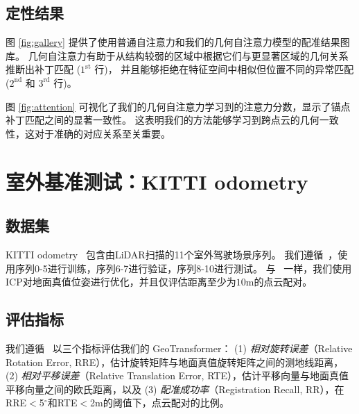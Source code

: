 \subsection{定性结果}
%
图 \ref{fig:gallery} 提供了使用普通自注意力和我们的几何自注意力模型的配准结果图库。
几何自注意力有助于从结构较弱的区域中根据它们与更显著区域的几何关系推断出补丁匹配 ($1^{\text{st}}$ 行)，
并且能够拒绝在特征空间中相似但位置不同的异常匹配 ($2^{\text{nd}}$ 和 $3^{\text{rd}}$ 行)。

图 \ref{fig:attention} 可视化了我们的几何自注意力学习到的注意力分数，显示了锚点补丁匹配之间的显著一致性。
这表明我们的方法能够学习到跨点云的几何一致性，这对于准确的对应关系至关重要。



\section{室外基准测试：KITTI odometry}
\label{sec:exp-outdoor}

\subsection{数据集}
KITTI odometry~\cite{geiger2012we} 包含由LiDAR扫描的11个室外驾驶场景序列。
我们遵循~\cite{choy2019fully,bai2020d3feat,huang2021predator}，使用序列0-5进行训练，序列6-7进行验证，序列8-10进行测试。
与~\cite{choy2019fully,bai2020d3feat,huang2021predator} 一样，我们使用ICP对地面真值位姿进行优化，并且仅评估距离至少为$10\text{m}$的点云配对。

\subsection{评估指标}
我们遵循~\cite{huang2021predator} 以三个指标评估我们的 GeoTransformer：
(1) \emph{相对旋转误差}（Relative Rotation Error, RRE），估计旋转矩阵与地面真值旋转矩阵之间的测地线距离，
(2) \emph{相对平移误差}（Relative Translation Error, RTE），估计平移向量与地面真值平移向量之间的欧氏距离，以及
(3) \emph{配准成功率}（Registration Recall, RR），在RRE$<$5$^\circ$和RTE$<$2m的阈值下，点云配对的比例。

